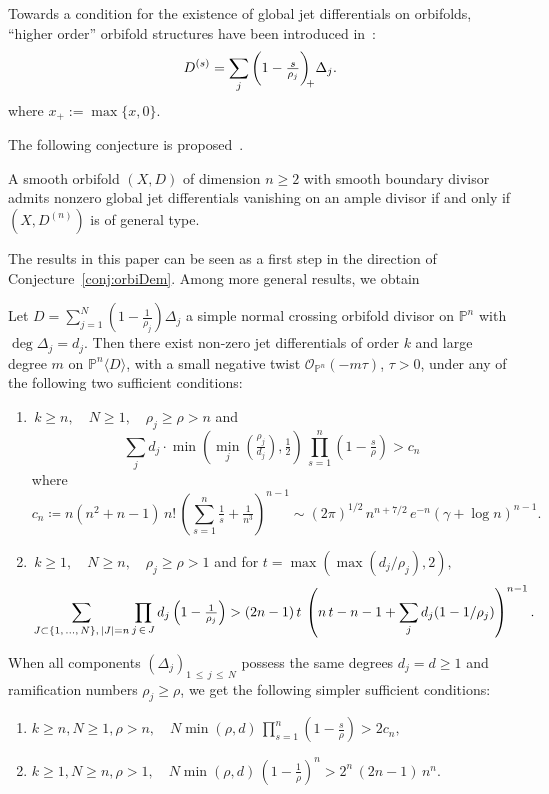 \documentclass[AHL,Unicode,longabstracts,published]{cedram}
\DeclarePairedDelimiter{\abs}{\lvert}{\rvert}
\newcommand*\cO{\mathcal{O}}
\newcommand*\bP{\mathbb{P}}
\let\leq\leqslant
\let\geq\geqslant
\newcommand*\bydef{\coloneqq}
\newcommand*{\alphenumi}{\renewcommand*{\theenumi}{\alph{enumi}}}
\begin{document}
Towards a condition for the existence of global jet differentials on orbifolds, ``higher order'' orbifold structures have been introduced in~\cite{CDR20}:
\[
D^{(s)}=\sum_j\bigg(1-\tfrac{s}{\rho_j}\bigg)_{\kern-3pt+}\Delta_j.
\]
where $x_+:=\max \{x, 0\}.$

The following conjecture is proposed~\cite{CDR20}.
\begin{conj}\label{conj:orbiDem}
A smooth orbifold $(X, D)$ of dimension $n\geq2$ with smooth boundary divisor admits nonzero global jet differentials vanishing on an ample divisor if and only if
$(X, D^{(n)})$ is of general type.
\end{conj}

The results in this paper can be seen as a first step in the direction of Conjecture~\ref{conj:orbiDem}. Among more general results, we obtain
\begin{theo}\label{theo:existence}
Let $D=\sum_{j=1}^N(1-\tfrac{1}{\rho_j})\Delta_j$ a simple normal crossing orbifold divisor on $\bP^n$ with
$\deg\Delta_j=d_j$. Then there exist non-zero jet differentials of order $k$ and large degree $m$ on $\bP^n\langle D\rangle$, with a small negative twist $\cO_{\bP^n}(-m\tau)$, $\tau>0$, under any of the following two sufficient conditions:
\begin{enumerate}
\item
$\,k\geq n,\quad N\geq 1,\quad \rho_j\geq \rho>n$ and\vskip-8pt
\[
\sum_j d_j\cdot
\min\left(\!\min_j\left(\tfrac{\rho_j}{ d_j}\right),\tfrac{1}{ 2}\right)
\,\prod_{s=1}^n\left(1-\tfrac{s}{\rho}\right)>c_n
\]
where
\[
c_n
\bydef n(n^2+n-1)\,n!\,\left(\sum_{s=1}^n\tfrac{1}{ s}+\tfrac{1}{ n^3}\right)^{n-1}
\sim(2\pi)^{1/2}\, n^{n+7/2}\,e^{-n}(\gamma+\log n)^{n-1}.
\]
\item
$\,k\geq 1,\quad N\geq n,\quad \rho_j\geq \rho>1$ and for $t=\max(\max(d_j/\rho_j),2),$\vskip-10pt
\[
\sum_{J\subset\{1,\,\dotsc,\,N\},\,\abs{J}=n}
\prod_{j\,\in\,J}d_j\left(1-\tfrac{1}{ \rho_j}\right)> (2n-1)\,t\,
\left(n\,t-n-1+\sum_jd_j(1-1/\rho_j)\right)^{n-1}.
\]
\end{enumerate}

When all components $(\Delta_j)_{1\,\leq\,j\,\leq\,N}$ possess the same degrees $d_j=d\geq 1$ and ramification numbers $\rho_j\geq\rho$, we get the following simpler sufficient conditions:
\begin{enumerate}\alphenumi
\item
$ k\geq n, N\geq 1, \rho>n,\quad N\min(\rho,d)\,\prod_{s=1}^n(1-\tfrac{s}{\rho})>2c_n,$
\item
$k\geq 1, N\geq n, \rho>1,\quad N\min(\rho,d)\,(1-\tfrac{1}{\rho})^n>2^n\,(2n-1)\,n^n.$
\end{enumerate}
\end{theo}
\end{document}
